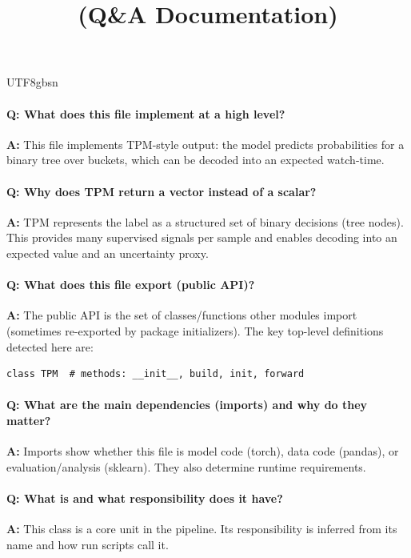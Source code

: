 \documentclass[11pt]{article}
\title{\texttt{\detokenize{model/tpm.py}} (Q\&A Documentation)}
\author{}
\date{}
\begin{document}
\begin{CJK*}{UTF8}{gbsn}
\maketitle

\paragraph{Q: What does this file implement at a high level?}
\textbf{A:} This file implements TPM-style output: the model predicts probabilities for a binary tree over buckets, which can be decoded into an expected watch-time.

\paragraph{Q: Why does TPM return a vector instead of a scalar?}
\textbf{A:} TPM represents the label as a structured set of binary decisions (tree nodes). This provides many supervised signals per sample and enables decoding into an expected value and an uncertainty proxy.

\paragraph{Q: What does this file export (public API)?}
\textbf{A:} The public API is the set of classes/functions other modules import (sometimes re-exported by package initializers). The key top-level definitions detected here are:

\begin{Verbatim}[fontsize=\small]
class TPM  # methods: __init__, build, init, forward
\end{Verbatim}

\paragraph{Q: What are the main dependencies (imports) and why do they matter?}
\textbf{A:} Imports show whether this file is model code (torch), data code (pandas), or evaluation/analysis (sklearn). They also determine runtime requirements.

\vspace{1mm}


\paragraph{Q: What is \texttt{} and what responsibility does it have?}
\textbf{A:} This class is a core unit in the pipeline. Its responsibility is inferred from its name and how run scripts call it.


\end{CJK*}
\end{document}
